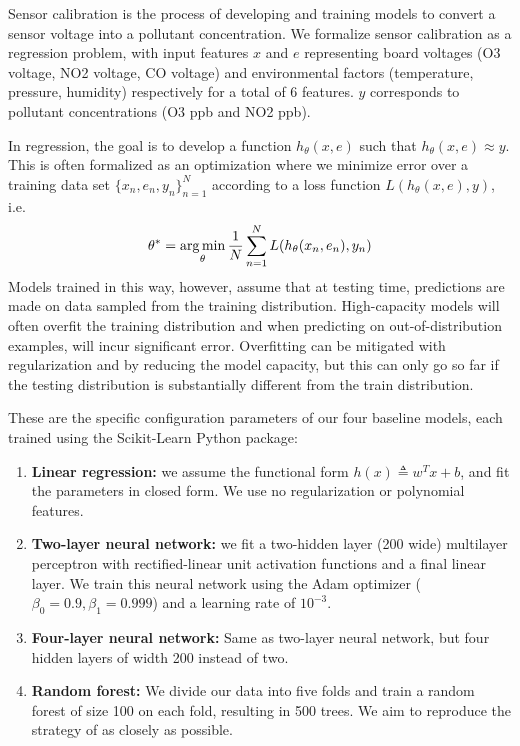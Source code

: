 \documentclass[journal abbreviation, manuscript]{copernicus}
\begin{document}
Sensor calibration is the process of developing and training models to convert a sensor voltage into a pollutant concentration. We formalize sensor calibration as a regression problem, with input features $x$ and $e$ representing board voltages (O3 voltage, NO2 voltage, CO voltage) and environmental factors (temperature, pressure, humidity) respectively for a total of 6 features. $y$ corresponds to pollutant concentrations (O3 ppb and NO2 ppb). 

In regression, the goal is to develop a function $h_\theta(x, e)$ such that $h_\theta(x, e) \approx y$. This is often formalized as an optimization where we minimize error over a training data set $\{x_n, e_n, y_n\}_{n = 1}^N$ according to a loss function $L(h_\theta(x, e), y)$, i.e. 
\begin{equation}
\theta^* = \operatorname*{arg\,min}_\theta \frac{1}{N}\sum_{n = 1}^N L(h_\theta(x_n, e_n), y_n)
\end{equation}
Models trained in this way, however, assume that at testing time, predictions are made on data sampled from the training distribution. High-capacity models will often overfit the training distribution and when predicting on out-of-distribution examples, will incur significant error. Overfitting can be mitigated with regularization and by reducing the model capacity, but this can only go so far if the testing distribution is substantially different from the train distribution.


These are the specific configuration parameters of our four baseline models, each trained using the Scikit-Learn Python package: 
\begin{enumerate}
    \item \textbf{Linear regression:} we assume the functional form $h(x) \triangleq w^T x + b$, and fit the parameters in closed form. We use no regularization or polynomial features.
    \item \textbf{Two-layer neural network:} we fit a two-hidden layer (200 wide) multilayer perceptron with rectified-linear unit activation functions and a final linear layer. We train this neural network using the Adam optimizer ($\beta_0 = 0.9, \beta_1 = 0.999$) and a learning rate of $10^{-3}$.
    \item \textbf{Four-layer neural network:} Same as two-layer neural network, but four hidden layers of width 200 instead of two.
    \item \textbf{Random forest:} We divide our data into five folds and train a random forest of size 100 on each fold, resulting in 500 trees. We aim to reproduce the strategy of \cite{Zimmerman2018} as closely as possible.
\end{enumerate}
\end{document}
